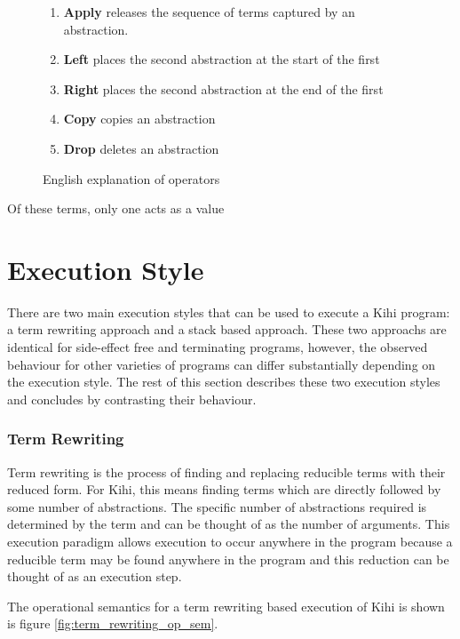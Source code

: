 \begin{figure}
    \centering
    \begin{enumerate}
        \item \textbf{Apply} releases the sequence of terms captured by an abstraction.
        \item \textbf{Left} places the second abstraction at the start of the first
        \item \textbf{Right} places the second abstraction at the end of the first
        \item \textbf{Copy} copies an abstraction
        \item \textbf{Drop} deletes an abstraction
    \end{enumerate}
    \caption{English explanation of operators}
    \label{fig:operator explanation}
\end{figure}

Of these terms, only one acts as a value

\section{Execution Style}
There are two main execution styles that can be used to execute
a Kihi program: a term rewriting approach and a stack based 
approach. These two approachs are identical for side-effect
free and terminating programs, however, the observed
behaviour for other varieties of programs can differ
substantially depending on the execution style. The rest of 
this section describes these two execution styles and 
concludes by contrasting their behaviour.

\subsubsection{Term Rewriting}
Term rewriting is the process of finding
and replacing reducible terms with their reduced form. For Kihi,
this means finding terms which are directly followed by
some number of abstractions. The specific number of abstractions
required is determined by the term and can be thought of as the
number of arguments. This execution paradigm allows execution
to occur anywhere in the program because a reducible term may
be found anywhere in the program and this reduction can be
thought of as an execution step.

The operational semantics for a term rewriting based execution of
Kihi is shown is figure \ref{fig:term_rewriting_op_sem}.





